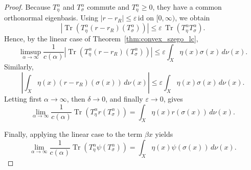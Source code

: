 \documentclass[10pt,a4paper]{amsart}
\begin{document}
\begin{proof}
Because $T_\eta^\alpha$ and $T_\sigma^\alpha$ commute and
$T_\eta^\alpha\geq0$, they have a common orthonormal eigenbasis.
Using $|r-r_R|\leq\varepsilon\,\mathrm{id}$ on $[0,\infty)$, we obtain
\[
\left|
\operatorname{Tr}\!\left(
T_\eta^\alpha(r-r_R)(T_\sigma^\alpha)
\right)
\right|
\leq
\varepsilon\,
\operatorname{Tr}\!\left(
T_\eta^\alpha T_\sigma^\alpha
\right).
\]
Hence, by the linear case of Theorem~\ref{thm:convex_szego_lc},
\[
\limsup_{\alpha\to\infty}
\frac{1}{c(\alpha)}
\left|
\operatorname{Tr}\!\left(
T_\eta^\alpha(r-r_R)(T_\sigma^\alpha)
\right)
\right|
\leq
\varepsilon\int_X\eta(x)\sigma(x)\,d\nu(x).
\]
Similarly,
\[
\left|
\int_X\eta(x)(r-r_R)(\sigma(x))\,d\nu(x)
\right|
\leq
\varepsilon\int_X\eta(x)\sigma(x)\,d\nu(x).
\]
Letting first $\alpha\to\infty$, then $\delta\to0$, and finally
$\varepsilon\to0$, gives
\[
\lim_{\alpha\to\infty}
\frac{1}{c(\alpha)}
\operatorname{Tr}\!\left(
T_\eta^\alpha r(T_\sigma^\alpha)
\right)
=
\int_X\eta(x)r(\sigma(x))\,d\nu(x).
\]

Finally, applying the linear case to the term $\beta x$ yields
\[
\lim_{\alpha\to\infty}
\frac{1}{c(\alpha)}
\operatorname{Tr}\!\left(
T_\eta^\alpha\psi(T_\sigma^\alpha)
\right)
=
\int_X\eta(x)\psi(\sigma(x))\,d\nu(x).
\]


\end{proof}
\end{document}

